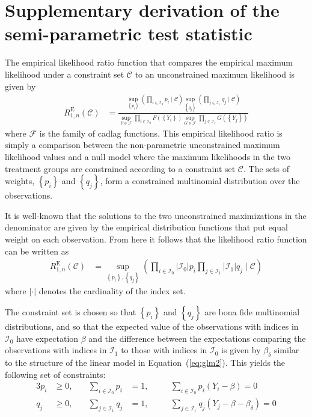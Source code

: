 \section{Supplementary derivation of the semi-parametric test statistic}\label{app:supplementary-derivation}

The empirical likelihood ratio function that compares the empirical maximum likelihood under a constraint set $\mathcal{C}$ to an unconstrained maximum likelihood is given by
\begin{align}
R_{1,n}^\text{E}(\mathcal{C}) &= \frac{\sup\limits_{\left\{p_i\right\}}\left(\prod_{i \in \mathcal{I}_0} p_i \mid \mathcal{C}\right) \sup\limits_{\left\{q_j\right\}}\left(\prod_{j \in \mathcal{I}_1} q_j \mid \mathcal{C}\right)}{\sup\limits_{F \in \mathcal{F}}\prod_{i \in \mathcal{I}_0} F(\left\{Y_i\right\}) \sup\limits_{G \in \mathcal{F}}\prod_{j \in \mathcal{I}_1} G(\left\{Y_j\right\})}
\end{align}
where $\mathcal{F}$ is the family of cadlag functions. This empirical likelihood ratio is simply a comparison between the non-parametric unconstrained maximum likelihood values and a null model where the maximum likelihoods in the two treatment groups are constrained according to a constraint set $\mathcal{C}$. The sets of weights, $\left\{p_i\right\}$ and $\left\{q_j\right\}$, form a constrained multinomial distribution over the observations.

It is well-known that the solutions to the two unconstrained maximizations in the denominator are given by the empirical distribution functions that put equal weight on each observation. From here it follows that the likelihood ratio function can be written as
\begin{align}
R_{1,n}^\text{E}(\mathcal{C}) &= \sup\limits_{\left\{p_i\right\}, \left\{q_j\right\}} \left(\prod_{i \in \mathcal{I}_0} |\mathcal{I}_0| p_i \prod_{j \in \mathcal{I}_1} |\mathcal{I}_1| q_j \mid \mathcal{C}\right)\label{eq:empiricalLik1}
\end{align}
where $|\cdot|$ denotes the cardinality of the index set.

The constraint set is chosen so that $\left\{p_i\right\}$ and $\left\{q_j\right\}$ are bona fide multinomial distributions, and so that the expected value of the observations with indices in $\mathcal{I}_0$ have expectation $\beta$ and the difference between the expectations comparing the observations with indices in $\mathcal{I}_1$ to those with indices in $\mathcal{I}_0$ is given by $\beta_\delta$ similar to the structure of the linear model in Equation~(\ref{eq:glm2}). This yields the following set of constraints:
\begin{alignat}{3}
 p_i &\geq 0,  &\quad \sum_{i \in \mathcal{I}_0} p_i &= 1,  &\quad &\sum_{i \in \mathcal{I}_0} p_i (Y_i - \beta) = 0\\
 q_j &\geq 0,  &\quad \sum_{j \in \mathcal{I}_1} q_j &= 1,  &\quad &\sum_{j \in \mathcal{I}_1} q_j (Y_j - \beta - \beta_\delta) = 0
\end{alignat}

